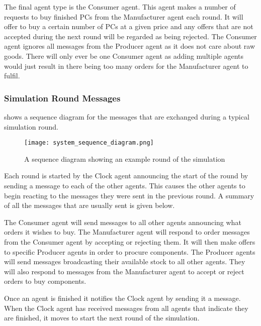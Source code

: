 The final agent type is the Consumer agent.
This agent makes a number of requests to buy finished PCs from the Manufacturer agent each round.
It will offer to buy a certain number of PCs at a given price and any offers that are not accepted during the next round will be regarded as being rejected.
The Consumer agent ignores all messages from the Producer agent as it does not care about raw goods.
There will only ever be one Consumer agent as adding multiple agents would just result in there being too many orders for the Manufacturer agent to fulfil.

\subsubsection{Simulation Round Messages}

 shows a sequence diagram for the messages that are exchanged during a typical simulation round.

\begin{figure}[ht]
    \centering
    \texttt{[image: system\_sequence\_diagram.png]}
    \caption{A sequence diagram showing an example round of the simulation}\label{fig:system_sequence_diagram}
\end{figure}

Each round is started by the Clock agent announcing the start of the round by sending a message to each of the other agents.
This causes the other agents to begin reacting to the messages they were sent in the previous round.
A summary of all the messages that are usually sent is given below.

The Consumer agent will send messages to all other agents announcing what orders it wishes to buy.
The Manufacturer agent will respond to order messages from the Consumer agent by accepting or rejecting them.
It will then make offers to specific Producer agents in order to procure components.
The Producer agents will send messages broadcasting their available stock to all other agents.
They will also respond to messages from the Manufacturer agent to accept or reject orders to buy components.

Once an agent is finished it notifies the Clock agent by sending it a message.
When the Clock agent has received messages from all agents that indicate they are finished, it moves to start the next round of the simulation.
